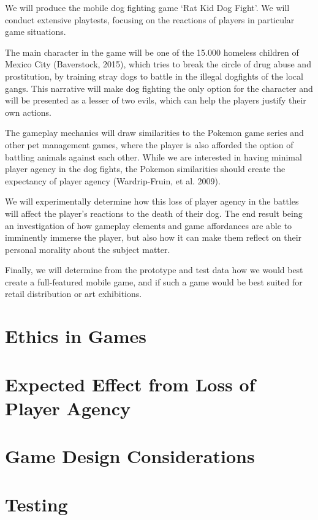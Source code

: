 \documentclass[preprint,12pt, authoryear]{elsarticle}
\begin{document}
We will produce the mobile dog fighting game ‘Rat Kid Dog Fight’. We will conduct extensive playtests, focusing on the reactions of players in particular game situations.\

The main character in the game will be one of the 15.000 homeless children of Mexico City (Baverstock, 2015), which tries to break the circle of drug abuse and prostitution, by training stray dogs to battle in the illegal dogfights of the local gangs. This narrative will make dog fighting the only option for the character and will be presented as a lesser of two evils, which can help the players justify their own actions. \

The gameplay mechanics will draw similarities to the Pokemon game series and other pet management games, where the player is also afforded the option of battling animals against each other. While we are interested in having minimal player agency in the dog fights, the Pokemon similarities should create the expectancy of player agency (Wardrip-Fruin, et al. 2009). \

We will experimentally determine how this loss of player agency in the battles will affect the player’s reactions to the death of their dog. The end result being an investigation of how gameplay elements and game affordances are able to imminently immerse the player, but also how it can make them reflect on their personal morality about the subject matter.\

Finally, we will determine from the prototype and test data how we would best create a full-featured mobile game, and if such a game would be best suited for retail distribution or art exhibitions.\

\section{Ethics in Games}
\label{Ethics}


\section{Expected Effect from Loss of Player Agency}
\label{Agency}


\section{Game Design Considerations}
\label{Design}


\section{Testing}

\end{document}
